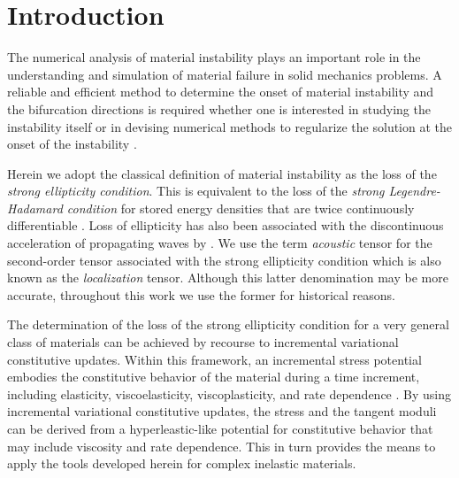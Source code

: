\documentclass[12pt]{article}
\numberwithin{equation}{section}
\begin{document}

\section{Introduction}
\label{sec:intro}

The numerical analysis of material instability plays an important role
in the understanding and simulation of material failure in solid
mechanics problems. A reliable and efficient method to determine the
onset of material instability and the bifurcation directions is
required whether one is interested in studying the instability itself
or in devising numerical methods to regularize the solution at the
onset of the instability \citep{Simo.etal:1993, Oliver:1996a,
  Oliver:1996b, Armero.Garikipati:1996, Moes.Belytschko:2002,
  Foster.etal:2007, Chen.etal:2011}.

Herein we adopt the classical definition of material instability as
the loss of the \emph{strong ellipticity condition}. This is
equivalent to the loss of the \emph{strong Legendre-Hadamard
  condition} for stored energy densities that are twice continuously
differentiable \citep{Antman:2005}. Loss of ellipticity has also been
associated with the discontinuous acceleration of propagating waves by
\citet{Hill:1962}. We use the term \emph{acoustic} tensor for the
second-order tensor associated with the strong ellipticity condition
which is also known as the \emph{localization} tensor. Although this
latter denomination may be more accurate, throughout this work we use
the former for historical reasons.

The determination of the loss of the strong ellipticity condition for
a very general class of materials can be achieved by recourse to
incremental variational constitutive updates. Within this framework,
an incremental stress potential embodies the constitutive behavior of
the material during a time increment, including elasticity,
viscoelasticity, viscoplasticity, and rate dependence
\citep{Ortiz.Stainier:1999, Lambrecht.etal:2003, Miehe.etal:2004,
  Weinberg.etal:2006, Fancello.etal:2006, Mosler.Bruhns:2010,
  Bleier.Mosler:2012}. By using incremental variational constitutive
updates, the stress and the tangent moduli can be derived from a
hyperleastic-like potential for constitutive behavior that may include
viscosity and rate dependence. This in turn provides the means to
apply the tools developed herein for complex inelastic materials.
\end{document}
